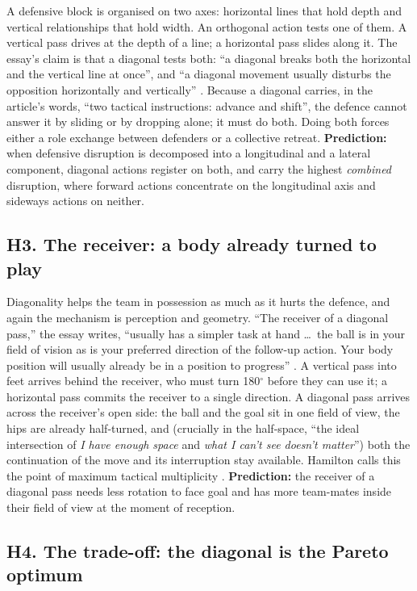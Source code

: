 \documentclass[11pt]{article}
\begin{document}
A defensive block is organised on two axes: horizontal lines that hold
depth and vertical relationships that hold width. An orthogonal action
tests one of them. A vertical pass drives at the depth of a line; a
horizontal pass slides along it. The essay's claim is that a diagonal
tests both: ``a diagonal breaks both the horizontal and the vertical line
at once'', and ``a diagonal movement usually disturbs the opposition
horizontally and vertically'' \citep{spielverlagerung2025}. Because a
diagonal carries, in the article's words, ``two tactical instructions:
advance and shift'', the defence cannot answer it by sliding or by
dropping alone; it must do both. Doing both forces either a role
exchange between defenders or a collective retreat. \textbf{Prediction:}
when defensive disruption is decomposed into a longitudinal and a lateral
component, diagonal actions register on both, and carry the highest
\emph{combined} disruption, where forward actions concentrate on the
longitudinal axis and sideways actions on neither.

\subsection{H3. The receiver: a body already turned to play}
\label{sec:h3}

Diagonality helps the team in possession as much as it hurts the defence,
and again the mechanism is perception and geometry. ``The receiver of a
diagonal pass,'' the essay writes, ``usually has a simpler task at hand
\dots\ the ball is in your field of vision as is your preferred direction
of the follow-up action. Your body position will usually already be in a
position to progress'' \citep{spielverlagerung2025}. A vertical pass into
feet arrives behind the receiver, who must turn 180$^\circ$ before they
can use it; a horizontal pass commits the receiver to a single direction.
A diagonal pass arrives across the receiver's open side: the ball and the
goal sit in one field of view, the hips are already half-turned, and
(crucially in the half-space, ``the ideal intersection of \emph{I have
enough space} and \emph{what I can't see doesn't matter}'') both the
continuation of the move and its interruption stay available. Hamilton
calls this the point of maximum tactical multiplicity
\citep{hamilton2024}. \textbf{Prediction:} the receiver of a diagonal pass
needs less rotation to face goal and has more team-mates inside their
field of view at the moment of reception.

\subsection{H4. The trade-off: the diagonal is the Pareto optimum}
\label{sec:h4}
\end{document}
